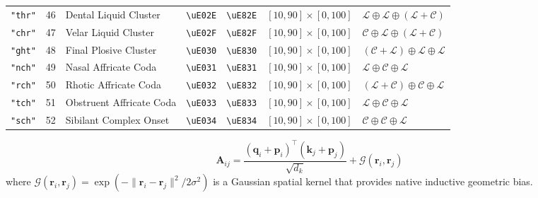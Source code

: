 \documentclass[11pt,oneside,letterpaper]{article}
\theoremstyle{sovereignstyle}
\begin{document}
\begin{table}[b]
\begin{tabularx}{\textwidth}{cc>{\raggedright\arraybackslash}Xcc>{\raggedright\arraybackslash}p{3.2cm}>{\raggedright\arraybackslash}X}
\texttt{"thr"}  & 46 & Dental Liquid Cluster      & \texttt{\textbackslash uE02E} & \texttt{\textbackslash uE82E} & $[10, 90] \times [0, 100]$ & $\mathcal{L} \oplus \mathcal{L} \oplus (\mathcal{L}+\mathcal{C})$ \\
\texttt{"chr"}  & 47 & Velar Liquid Cluster       & \texttt{\textbackslash uE02F} & \texttt{\textbackslash uE82F} & $[10, 90] \times [0, 100]$ & $\mathcal{C} \oplus \mathcal{L} \oplus (\mathcal{L}+\mathcal{C})$ \\
\texttt{"ght"}  & 48 & Final Plosive Cluster      & \texttt{\textbackslash uE030} & \texttt{\textbackslash uE830} & $[10, 90] \times [0, 100]$ & $(\mathcal{C}+\mathcal{L}) \oplus \mathcal{L} \oplus \mathcal{L}$ \\
\texttt{"nch"}  & 49 & Nasal Affricate Coda       & \texttt{\textbackslash uE031} & \texttt{\textbackslash uE831} & $[10, 90] \times [0, 100]$ & $\mathcal{L} \oplus \mathcal{C} \oplus \mathcal{L}$ \\
\texttt{"rch"}  & 50 & Rhotic Affricate Coda      & \texttt{\textbackslash uE032} & \texttt{\textbackslash uE832} & $[10, 90] \times [0, 100]$ & $(\mathcal{L}+\mathcal{C}) \oplus \mathcal{C} \oplus \mathcal{L}$ \\
\texttt{"tch"}  & 51 & Obstruent Affricate Coda   & \texttt{\textbackslash uE033} & \texttt{\textbackslash uE833} & $[10, 90] \times [0, 100]$ & $\mathcal{L} \oplus \mathcal{C} \oplus \mathcal{L}$ \\
\texttt{"sch"}  & 52 & Sibilant Complex Onset     & \texttt{\textbackslash uE034} & \texttt{\textbackslash uE834} & $[10, 90] \times [0, 100]$ & $\mathcal{C} \oplus \mathcal{C} \oplus \mathcal{L}$ \\
\bottomrule
\end{tabularx}
\end{table}

\begin{equation}
\mathbf{A}_{ij} = \frac{(\mathbf{q}_i + \mathbf{p}_i)^\top (\mathbf{k}_j + \mathbf{p}_j)}{\sqrt{d_k}} + \mathcal{G}(\mathbf{r}_i, \mathbf{r}_j)
\end{equation}
where $\mathcal{G}(\mathbf{r}_i, \mathbf{r}_j) = \exp(-\|\mathbf{r}_i - \mathbf{r}_j\|^2 / 2\sigma^2)$ is a Gaussian spatial kernel that provides native inductive geometric bias.
\end{document}
